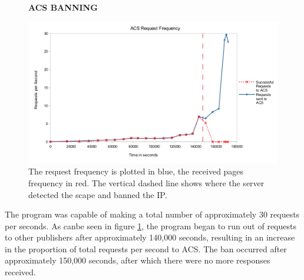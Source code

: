 \begin{figure}[H]
    \centering
    \textbf{ACS BANNING}\par\medskip
    \includegraphics[width=\textwidth]{Data_Acquisition/ACS_crash_line.png}
    \caption[Request Frequency Leading to ACS Ban]{The request frequency is plotted in blue, the received pages frequency in red. The vertical dashed line shows where the server detected the scape and banned the IP.}
     \label{fig:ACSBAN}
\end{figure}
The program was capable of making a total number of approximately 30 requests per seconds. As canbe seen in figure \ref{fig:ACSBAN}, the program began to run out of requests to other publishers after approximately 140,000 seconds, resulting in an increase in the proportion of total requests per second to ACS. The ban occurred after approximately 150,000 seconds, after which there were no more responses received.
